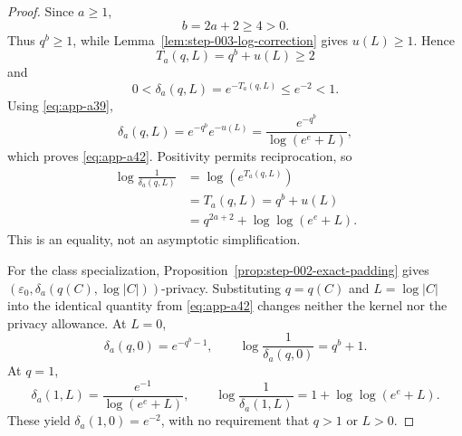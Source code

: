 \begin{proof}
Since \(a\geq1\),
\begin{equation}
b=2a+2\geq4>0.
\label{eq:app-a44}
\end{equation}
Thus \(q^b\geq1\), while
Lemma~\ref{lem:step-003-log-correction} gives \(u(L)\geq1\).  Hence
\begin{equation}
T_a(q,L)=q^b+u(L)\geq2
\label{eq:app-a45}
\end{equation}
and
\begin{equation}
0<\delta_a(q,L)=e^{-T_a(q,L)}\leq e^{-2}<1.
\label{eq:app-a46}
\end{equation}
Using \eqref{eq:app-a39},
\begin{equation}
\delta_a(q,L)
=e^{-q^b}e^{-u(L)}
=\frac{e^{-q^b}}{\log(e^e+L)},
\label{eq:app-a47}
\end{equation}
which proves \eqref{eq:app-a42}.  Positivity permits reciprocation, so
\begin{equation}
\begin{aligned}
\log\frac1{\delta_a(q,L)}
&=\log(e^{T_a(q,L)})\\
&=T_a(q,L)
=q^b+u(L)\\
&=q^{2a+2}+\log\log(e^e+L).
\end{aligned}
\label{eq:app-a48}
\end{equation}
This is an equality, not an asymptotic simplification.

For the class specialization, Proposition~\ref{prop:step-002-exact-padding}
gives \((\varepsilon_0,\delta_a(q(C),\log|C|))\)-privacy.  Substituting
\(q=q(C)\) and \(L=\log|C|\) into the identical
quantity from \eqref{eq:app-a42} changes neither the kernel nor the privacy
allowance.  At \(L=0\),
\begin{equation}
\delta_a(q,0)=e^{-q^b-1},\qquad
\log\frac1{\delta_a(q,0)}=q^b+1.
\label{eq:app-a49}
\end{equation}
At \(q=1\),
\begin{equation}
\delta_a(1,L)=\frac{e^{-1}}{\log(e^e+L)},\qquad
\log\frac1{\delta_a(1,L)}
=1+\log\log(e^e+L).
\label{eq:app-a50}
\end{equation}
These yield \(\delta_a(1,0)=e^{-2}\), with no requirement that
\(q>1\) or \(L>0\).
\end{proof}

